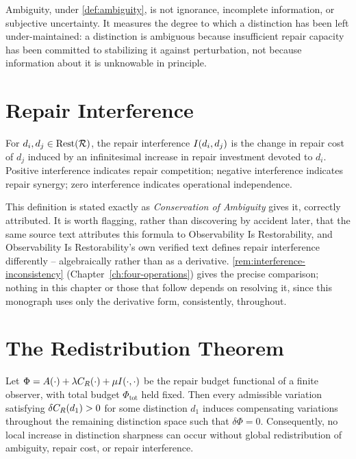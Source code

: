 Ambiguity, under \cref{def:ambiguity}, is not ignorance, incomplete
information, or subjective uncertainty. It measures the degree to which a
distinction has been left under-maintained: a distinction is ambiguous
because insufficient repair capacity has been committed to stabilizing it
against perturbation, not because information about it is unknowable in
principle.

\section{Repair Interference}

\begin{definition}
\label{def:interference}
For $d_i, d_j \in \mathrm{Rest}(\mathcal{R})$, the repair interference
$I(d_i,d_j)$ is the change in repair cost of $d_j$ induced by an
infinitesimal increase in repair investment devoted to $d_i$. Positive
interference indicates repair competition; negative interference
indicates repair synergy; zero interference indicates operational
independence.
\end{definition}

This definition is stated exactly as \emph{Conservation of Ambiguity}
gives it, correctly attributed. It is worth flagging, rather than
discovering by accident later, that the same source text attributes this
formula to Observability Is Restorability, and Observability Is
Restorability's own verified text defines repair interference differently
-- algebraically rather than as a derivative.
\cref{rem:interference-inconsistency} (Chapter~\ref{ch:four-operations})
gives the precise comparison; nothing in this chapter or those that follow
depends on resolving it, since this monograph uses only the derivative
form, consistently, throughout.

\section{The Redistribution Theorem}

\begin{theorem}
\label{thm:redistribution}
Let $\Phi = A(\cdot) + \lambda C_R(\cdot) + \mu I(\cdot,\cdot)$ be
the repair budget functional of a finite observer, with total budget
$\Phi_{\mathrm{tot}}$ held fixed. Then every admissible variation
satisfying $\delta C_R(d_1) > 0$ for some distinction $d_1$ induces
compensating variations throughout the remaining distinction space such
that $\delta\Phi = 0$. Consequently, no local increase in distinction
sharpness can occur without global redistribution of ambiguity, repair
cost, or repair interference.
\end{theorem}

